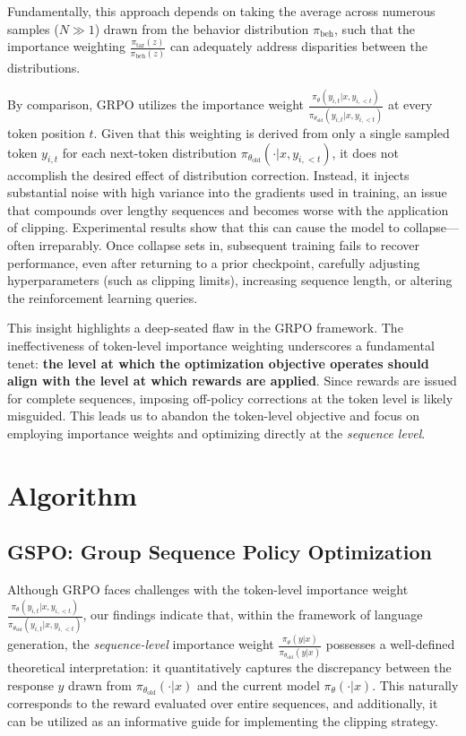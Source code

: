 Fundamentally, this approach depends on taking the average across numerous samples ($N \gg 1$) drawn from the behavior distribution $\pi_\text{beh}$, such that the importance weighting $\frac{ \pi_\text{tar} (z) }{ \pi_\text{beh} (z)}$ can adequately address disparities between the distributions.

By comparison, GRPO utilizes the importance weight $\frac{ \pi_{\theta} (y_{i,t} | x, y_{i,<t}) }{ \pi_{\theta_\text{old}} (y_{i,t} | x,y_{i,<t})}$ at every token position $t$. Given that this weighting is derived from only a single sampled token $y_{i,t}$ for each next-token distribution $\pi_{\theta_\text{old}}( \cdot | x, y_{i, <t})$, it does not accomplish the desired effect of distribution correction. Instead, it injects substantial noise with high variance into the gradients used in training, an issue that compounds over lengthy sequences and becomes worse with the application of clipping. Experimental results show that this can cause the model to collapse—often irreparably. Once collapse sets in, subsequent training fails to recover performance, even after returning to a prior checkpoint, carefully adjusting hyperparameters (such as clipping limits), increasing sequence length, or altering the reinforcement learning queries.

This insight highlights a deep-seated flaw in the GRPO framework. The ineffectiveness of token-level importance weighting underscores a fundamental tenet: \textbf{the level at which the optimization objective operates should align with the level at which rewards are applied}. Since rewards are issued for complete sequences, imposing off-policy corrections at the token level is likely misguided. This leads us to abandon the token-level objective and focus on employing importance weights and optimizing directly at the \textit{sequence level}.

\section{Algorithm}

\subsection{GSPO: Group Sequence Policy Optimization}

Although GRPO faces challenges with the token-level importance weight $\frac{ \pi_{\theta} (y_{i,t} | x, y_{i,<t}) }{ \pi_{\theta_\text{old}} (y_{i,t} | x,y_{i,<t})}$, our findings indicate that, within the framework of language generation, the \textit{sequence-level} importance weight $\frac{ \pi_{\theta} (y | x) }{ \pi_{\theta_\text{old}} (y | x)}$ possesses a well-defined theoretical interpretation: it quantitatively captures the discrepancy between the response $y$ drawn from $\pi_{\theta_\text{old}} (\cdot | x)$ and the current model $\pi_{\theta} (\cdot | x)$. This naturally corresponds to the reward evaluated over entire sequences, and additionally, it can be utilized as an informative guide for implementing the clipping strategy.

